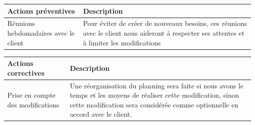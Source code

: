 \documentclass[a4paper,11pt,french]{article}
\begin{document}
\begin{center}
\begin{tabular}{|m{5cm}|m{11cm}|}
\hline
\rowcolor[gray]{.8} Actions préventives & Description\\
\hline
 Réunions hebdomadaires avec le client & Pour éviter de créer de nouveaux besoins, ces réunions avec le client nous aideront à respecter ses attentes et à limiter les modifications \\
\hline
\end{tabular}
\end{center}

\begin{center}
\begin{tabular}{|m{5cm}|m{11cm}|}
\hline
\rowcolor[gray]{.8} Actions correctives & Description\\
\hline
Prise en compte des modifications & Une réorganisation du planning sera faite si nous avons le temps et les moyens de réaliser cette modification, sinon cette modification sera considérée comme optionnelle en accord avec le client. \\
\hline
\end{tabular}
\end{center}


\end{document}
